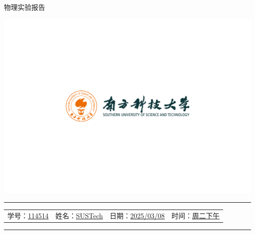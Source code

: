 \documentclass[12pt,a4paper]{article}
\begin{document}
	\noindent
	\hspace{-2em}
	\begin{minipage}[c]{0.65\textwidth}
		\raggedright
		{\fontsize{40pt}{60pt}\selectfont 物理实验报告}
	\end{minipage}
	\begin{minipage}[c]{0.35\textwidth}
		\raggedleft
		\includegraphics[width=\linewidth, trim={20cm 20cm 20cm 20cm}, clip]{university_logo.png}
	\end{minipage}

	\vspace{-1em}
	

	
	\hrule
	\vspace{0.4em}
	\noindent
	\begin{tabular}{l l l l}
    学号：\underline{114514} & 姓名：\underline{SUSTech} &
    日期：\underline{2025/03/08} & 时间：\underline{周二下午}
	\end{tabular}
	\vspace{-0em}
	\par
	\hrule

	

\end{document}
